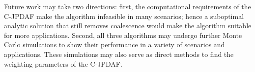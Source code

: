 \documentclass[letterpaper, 10pt, conference]{ieeeconf}
\begin{document}
Future work may take two directions: first, the computational requirements of the C-JPDAF make the algorithm infeasible in many scenarios; hence a suboptimal analytic solution that still removes coalescence would make the algorithm suitable for more applications. Second, all three algorithms may undergo further Monte Carlo simulations to show their performance in a variety of scenarios and applications.
These simulations may also serve as direct methods to find the weighting parameters of the C-JPDAF.

\end{document}
